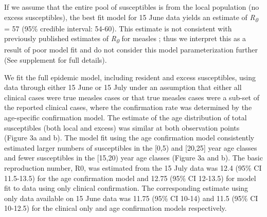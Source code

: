 If we assume that the entire pool of susceptibles is from the local population (no excess susceptibles), the best
fit model for 15 June data yields an estimate of
\emph{R\textsubscript{0}} = 57 (95\% credible interval: 54-60). This
estimate is not consistent with previously published estimates of
\emph{R\textsubscript{0}} for measles \cite{EDMUNDS_2000,MOSSONG_2000}; thus we interpret this
as a result of poor model fit and do not consider this model parameterization further (See supplement for full details).

We fit the full epidemic model, including resident and excess
susceptibles, using data through either 15 June or 15 July under an
assumption that either all clinical cases were true measles cases or
that true measles cases were a sub-set of the reported clinical cases,
where the confirmation rate was determined by the age-specific
confirmation model. The estimate of the age distribution of total
susceptibles (both local and excess) was similar at both observation
points (Figure 3a and b). The model fit using the age confirmation model
consistently estimated larger numbers of susceptibles in the {[}0,5) and
{[}20,25{]} year age classes and fewer susceptibles in the {[}15,20)
year age classes (Figure 3a and b). The basic reproduction number, R0,
was estimated from the 15 July data was 12.4 (95\% CI 11.5-13.5) for the
age confirmation model and 12.75 (95\% CI 12-13.5) for model fit to
data using only clinical confirmation. The corresponding estimate using only data available on 15
June data was 11.75 (95\% CI 10-14) and 11.5 (95\% CI 10-12.5) for the
clinical only and age confirmation models respectively.